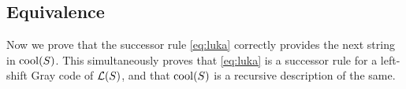 

\subsection{Equivalence}
\label{sec:proof_equal}

Now we prove that the successor rule \eqref{eq:luka} correctly provides the next string in $\operatorname{cool}(S)$.
This simultaneously proves that \eqref{eq:luka} is a successor rule for a left-shift Gray code of $\mathcal{L}(S)$, and that $\operatorname{cool}(S)$ is a recursive description of the same.

